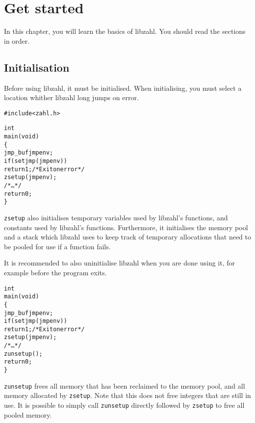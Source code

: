 \chapter{Get started}
\label{chap:Get started}

In this chapter, you will learn the basics of libzahl.
You should read the sections in order.

\vspace{1cm}
\minitoc




\newpage
\section{Initialisation}
\label{sec:Initialisation}

Before using libzahl, it must be initialised. When
initialising, you must select a location whither libzahl
long jumps on error.

\begin{alltt}
   #include <zahl.h>

   int
   main(void)
   \{
       jmp_buf jmpenv;
       if (setjmp(jmpenv))
           return 1; \textcolor{c}{/* \textrm{Exit on error} */}
       zsetup(jmpenv);
       \textcolor{c}{/* \textrm{\ldots} */}
       return 0;
   \}
\end{alltt}

{\tt zsetup} also initialises temporary variables used
by libzahl's functions, and constants used by libzahl's
functions. Furthermore, it initialises the memory pool
and a stack which libzahl uses to keep track of temporary
allocations that need to be pooled for use if a function
fails.

It is recommended to also uninitialise libzahl when you
are done using it, for example before the program exits.

\begin{alltt}
   \textcolor{c}{int
   main(void)
   \{
       jmp_buf jmpenv;
       if (setjmp(jmpenv))
           return 1; /* \textrm{Exit on error} */
       zsetup(jmpenv);
       /* \textrm{\ldots} */}
       zunsetup();
       \textcolor{c}{return 0;
   \}}
\end{alltt}

{\tt zunsetup} frees all memory that has been reclaimed to
the memory pool, and all memory allocated by {\tt zsetup}.
Note that this does not free integers that are still
in use. It is possible to simply call {\tt zunsetup}
directly followed by {\tt zsetup} to free all pooled
memory.


